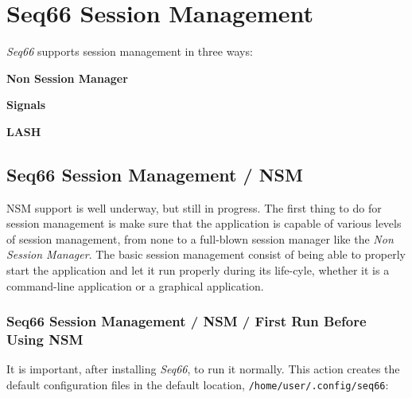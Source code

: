 %
%
%

\section{Seq66 Session Management}
\label{sec:sessions}

   \textsl{Seq66} supports session management in three ways:

   \begin{enumber}
      \item \textbf{Non Session Manager}
      \item \textbf{Signals}
      \item \textbf{LASH}
   \end{enumber}


\subsection{Seq66 Session Management / NSM}
\label{subsec:sessions_nsm}

   NSM support is well underway, but still in progress.
   The first thing to do for session management is make sure that the
   application is capable of various levels of session management, from none to
   a full-blown session manager like the \textsl{Non Session Manager}.  The
   basic session management consist of being able to properly start the
   application and let it run properly during its life-cyle, whether it is a
   command-line application or a graphical application.

\subsubsection{Seq66 Session Management / NSM / First Run Before Using NSM}
\label{subsec:sessions_nsm_before_using_nsm}

   It is important, after installing \textsl{Seq66}, to run it normally. This
   action creates the default configuration files in the default location,
   \texttt{/home/user/.config/seq66}:

